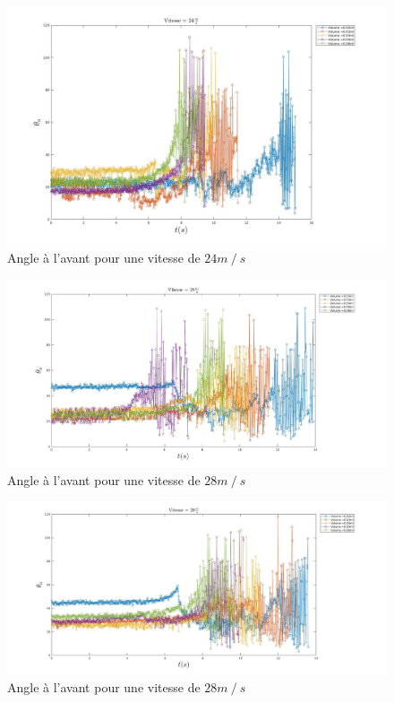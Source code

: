 \documentclass[french]{article}
\begin{document}
\begin{figure}[h]
	\centering
	\includegraphics[width = \linewidth]{./image/v=24oa_2.jpg}
	\caption{Angle à l'avant pour une vitesse de $24m\mathbin{/}s$}
\end{figure}
\begin{figure}[h]
	\centering
	\includegraphics[width = \linewidth]{./image/v=28oa_1.jpg}
	\caption{Angle à l'avant pour une vitesse de $28m\mathbin{/}s$}
\end{figure}
\begin{figure}[h]
	\centering
	\includegraphics[width = \linewidth]{./image/v=28oa_2.jpg}
	\caption{Angle à l'avant pour une vitesse de $28m\mathbin{/}s$}
\end{figure}
\end{document}
